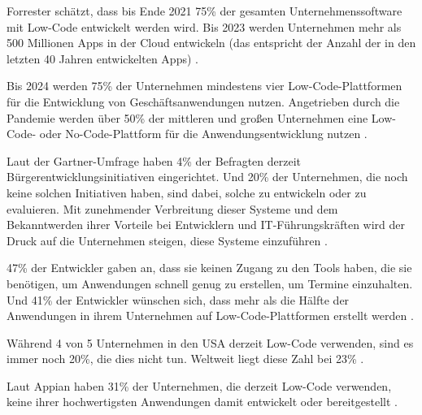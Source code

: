 \documentclass[12pt]{article} %
\begin{document}
	Forrester schätzt, dass bis Ende 2021 75\% der gesamten Unternehmenssoftware mit Low-Code entwickelt werden wird. Bis 2023 werden Unternehmen mehr als 500 Millionen Apps in der Cloud entwickeln (das entspricht der Anzahl der in den letzten 40 Jahren entwickelten Apps) \cite{KevinShuler.2023}.
	
	Bis 2024 werden 75\% der Unternehmen mindestens vier Low-Code-Plattformen für die Entwicklung von Geschäftsanwendungen nutzen. Angetrieben durch die Pandemie werden über 50\% der mittleren und großen Unternehmen eine Low-Code- oder No-Code-Plattform für die Anwendungsentwicklung nutzen \cite{KevinShuler.2023}. \newline
	
	Laut der Gartner-Umfrage haben 4\% der Befragten derzeit Bürgerentwicklungsinitiativen eingerichtet. Und 20\% der Unternehmen, die noch keine solchen Initiativen haben, sind dabei, solche zu entwickeln oder zu evaluieren. Mit zunehmender Verbreitung dieser Systeme und dem Bekanntwerden ihrer Vorteile bei Entwicklern und IT-Führungskräften wird der Druck auf die Unternehmen steigen, diese Systeme einzuführen \cite{KevinShuler.2023}.
	
	47\% der Entwickler gaben an, dass sie keinen Zugang zu den Tools haben, die sie benötigen, um Anwendungen schnell genug zu erstellen, um Termine einzuhalten. Und 41\% der Entwickler wünschen sich, dass mehr als die Hälfte der Anwendungen in ihrem Unternehmen auf Low-Code-Plattformen erstellt werden \cite{KevinShuler.2023}.
	
	Während 4 von 5 Unternehmen in den USA derzeit Low-Code verwenden, sind es immer noch 20\%, die dies nicht tun. Weltweit liegt diese Zahl bei 23\% \cite{KevinShuler.2023}.
	
	Laut Appian haben 31\% der Unternehmen, die derzeit Low-Code verwenden, keine ihrer hochwertigsten Anwendungen damit entwickelt oder bereitgestellt \cite{KevinShuler.2023}.
	
	
	
	
\end{document}
